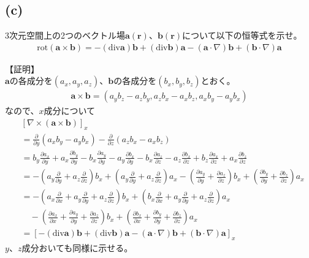 \documentclass[pdflatex,ja=standard,fleqn]{bxjsarticle}
\begin{document}
\subsection*{(c)}
\begin{screen}
    3次元空間上の2つのベクトル場$\boldsymbol{a}(\boldsymbol{r})$、$\boldsymbol{b}(\boldsymbol{r})$について以下の恒等式を示せ。
    \begin{eqnarray*}
        \mathrm{rot}(\boldsymbol{a}\times\boldsymbol{b})=-(\mathrm{div}\boldsymbol{a})\boldsymbol{b}+(\mathrm{div}\boldsymbol{b})\boldsymbol{a}-(\boldsymbol{a}\cdot\nabla)\boldsymbol{b}+(\boldsymbol{b}\cdot\nabla)\boldsymbol{a}
    \end{eqnarray*}
\end{screen}
【証明】\\
$\boldsymbol{a}$の各成分を$(a_{x},a_{y},a_{z})$、$\boldsymbol{b}$の各成分を$(b_{x},b_{y},b_{z})$とおく。
\begin{eqnarray*}
    \boldsymbol{a}\times\boldsymbol{b}=(a_{y}b_{z}-a_{z}b_{y},a_{z}b_{x}-a_{x}b_{z},a_{x}b_{y}-a_{y}b_{x})
\end{eqnarray*}
なので、$x$成分について
\begin{equation*}
    \begin{split}
        &\left[\nabla\times(\boldsymbol{a}\times\boldsymbol{b})\right]_x\\
        &=\frac{\partial}{\partial y}(a_{x}b_{y}-a_{y}b_{x})-\frac{\partial}{\partial z}(a_{z}b_{x}-a_{x}b_{z})\\
        &=b_{y}\frac{\partial a_{x}}{\partial y}+a_{x}\frac{\partial b_{y}}{\partial y}-b_{x}\frac{\partial a_{y}}{\partial y}-a_{y}\frac{\partial b_{x}}{\partial y}-b_{x}\frac{\partial a_{z}}{\partial z}-a_{z}\frac{\partial b_{x}}{\partial z}+b_{z}\frac{\partial a_{x}}{\partial z}+a_{x}\frac{\partial b_{z}}{\partial z}\\
        &=-\left(a_{y}\frac{\partial}{\partial y}+a_{z}\frac{\partial}{\partial z}\right)b_{x}+\left(a_{y}\frac{\partial}{\partial y}+a_{z}\frac{\partial}{\partial z}\right)a_{x}-\left(\frac{\partial a_{y}}{\partial y}+\frac{\partial a_{z}}{\partial z}\right)b_{x}+\left(\frac{\partial b_{y}}{\partial y}+\frac{\partial b_{z}}{\partial z}\right)a_{x}\\
        &=-\left(a_{x}\frac{\partial}{\partial x}+a_{y}\frac{\partial}{\partial y}+a_{z}\frac{\partial}{\partial z}\right)b_{x}+\left(b_{x}\frac{\partial}{\partial x}+a_{y}\frac{\partial}{\partial y}+a_{z}\frac{\partial}{\partial z}\right)a_{x}\\
        &\quad-\left(\frac{\partial a_{x}}{\partial x}+\frac{\partial a_{y}}{\partial y}+\frac{\partial a_{z}}{\partial z}\right)b_{x}+\left(\frac{\partial b_{x}}{\partial x}+\frac{\partial b_{y}}{\partial y}+\frac{\partial b_{z}}{\partial z}\right)a_{x}\\
        &=\left[-(\mathrm{div}\boldsymbol{a})\boldsymbol{b}+(\mathrm{div}\boldsymbol{b})\boldsymbol{a}-(\boldsymbol{a}\cdot\nabla)\boldsymbol{b}+(\boldsymbol{b}\cdot\nabla)\boldsymbol{a}\right]_x
    \end{split}
\end{equation*}
$y$、$z$成分おいても同様に示せる。
\end{document}
